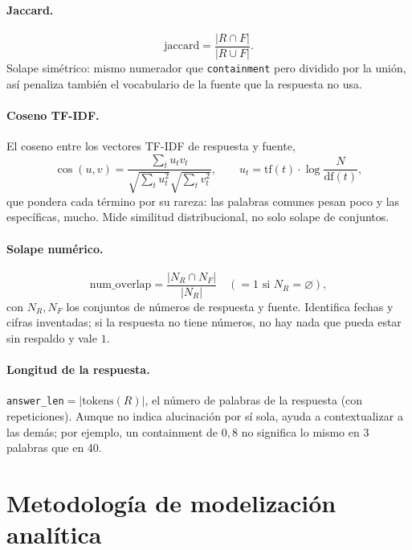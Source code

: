 \documentclass[12pt,a4paper]{report}
\theoremstyle{definition}
\newcommand{\tc}[1]{\texttt{#1}}
\begin{document}
\paragraph{Jaccard.}
\begin{equation}
\text{jaccard} = \frac{|R \cap F|}{|R \cup F|}.
\end{equation}
Solape simétrico: mismo numerador que \tc{containment} pero dividido por la unión, así
penaliza también el vocabulario de la fuente que la respuesta no usa.

\paragraph{Coseno TF-IDF.} El coseno entre los vectores TF-IDF de
respuesta y fuente,
\begin{equation}
\cos(u,v)=\frac{\sum_t u_t v_t}{\sqrt{\sum_t u_t^2}\sqrt{\sum_t v_t^2}},
\qquad u_t = \text{tf}(t)\cdot\log\frac{N}{\text{df}(t)},
\end{equation}
que pondera cada término por su rareza: las palabras comunes pesan poco y las específicas,
mucho. Mide similitud distribucional, no solo solape de conjuntos.

\paragraph{Solape numérico.}
\begin{equation}
\text{num\_overlap} = \frac{|N_R \cap N_F|}{|N_R|}\quad(=1 \text{ si } N_R=\varnothing),
\end{equation}
con $N_R, N_F$ los conjuntos de números de respuesta y fuente. Identifica fechas y cifras
inventadas; si la respuesta no tiene números, no hay nada que pueda estar sin respaldo y
vale $1$.

\paragraph{Longitud de la respuesta.} \tc{answer\_len}${}=|\text{tokens}(R)|$, el número de
palabras de la respuesta (con repeticiones). Aunque no indica alucinación por sí sola, ayuda a
contextualizar a las demás; por ejemplo, un containment de $0{,}8$ no significa lo mismo en 3 palabras que
en 40.

\section{Metodología de modelización analítica}
\label{sec:metodologia}
\end{document}
